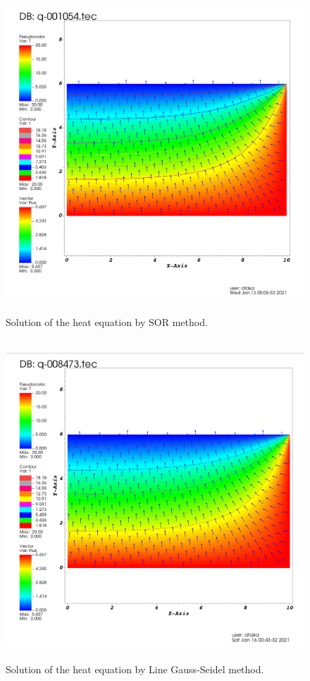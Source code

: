 \documentclass[letterpaper,12pt]{article}
\begin{document}
\begin{figure}[H] 
	\centering 
	\includegraphics[max height=12cm]{graphs/SOR_O19_norad/SOR_O19_norad.png}
	\caption{Solution of the heat equation by SOR method.}
 	\label{fig:sornorad}
\end{figure}
\begin{figure}[H] 
	\centering 
	\includegraphics[max height=12cm]{graphs/linegauss_norad/linegauss_norad.png}
	\caption{Solution of the heat equation by Line Gauss-Seidel method.}
 	\label{fig:linegaussnorad}
\end{figure}
\end{document}
